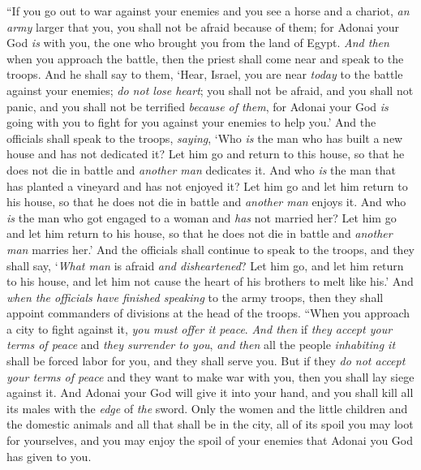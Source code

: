 \begin{biblechapter} %
\verse “If you go out to war against your enemies and you see a horse and a chariot, \textit{an army} larger that you, you shall not be afraid because of them; for Adonai your God \textit{is} with you, the one who brought you from the land of Egypt.
\verse \textit{And then} when you approach the battle, then the priest shall come near and speak to the troops.
\verse And he shall say to them, ‘Hear, Israel, you are near \textit{today} to the battle against your enemies; \textit{do not lose heart}; you shall not be afraid, and you shall not panic, and you shall not be terrified \textit{because of them},
\verse for Adonai your God \textit{is} going with you to fight for you against your enemies to help you.’
\verse And the officials shall speak to the troops, \textit{saying}, ‘Who \textit{is} the man who has built a new house and has not dedicated it? Let him go and return to this house, so that he does not die in battle and \textit{another man} dedicates it.
\verse And who \textit{is} the man that has planted a vineyard and has not enjoyed it? Let him go and let him return to his house, so that he does not die in battle and \textit{another man} enjoys it.
\verse And who \textit{is} the man who got engaged to a woman and \textit{has} not married her? Let him go and let him return to his house, so that he does not die in battle and \textit{another man} marries her.’
\verse And the officials shall continue to speak to the troops, and they shall say, ‘\textit{What man} is afraid \textit{and disheartened}? Let him go, and let him return to his house, and let him not cause the heart of his brothers to melt like his.’
\verse And \textit{when the officials have finished speaking} to the army troops, then they shall appoint commanders of divisions at the head of the troops.
\verse “When you approach a city to fight against it, \textit{you must offer it peace}.
\verse \textit{And then} if \textit{they accept your terms of peace} and \textit{they surrender to you}, \textit{and then} all the people \textit{inhabiting it} shall be forced labor for you, and they shall serve you.
\verse But if they \textit{do not accept your terms of peace} and they want to make war with you, then you shall lay siege against it.
\verse And Adonai your God will give it into your hand, and you shall kill all its males with the \textit{edge} of \textit{the} sword.
\verse Only the women and the little children and the domestic animals and all that shall be in the city, all of its spoil you may loot for yourselves, and you may enjoy the spoil of your enemies that Adonai you God has given to you.

\end{biblechapter}

